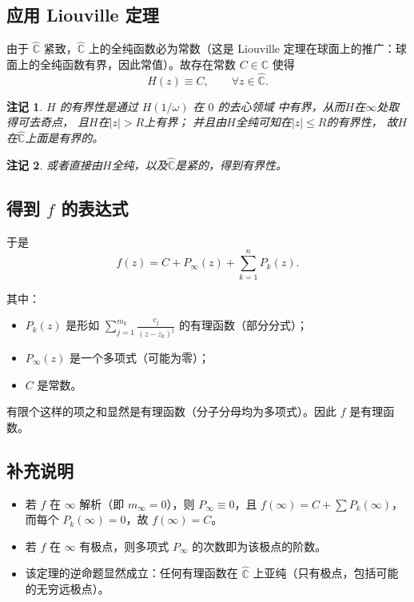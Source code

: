 \documentclass[UTF8]{ctexart}
\newtheorem{remark}{注记}[section]
\numberwithin{equation}{section}
\newcommand{\CC}{\mathbb{C}}
\begin{document}
\subsection{应用 Liouville 定理}

由于 $\widehat{\CC}$ 紧致，$\widehat{\CC}$ 上的全纯函数必为常数（这是 Liouville 定理在球面上的推广：球面上的全纯函数有界，因此常值）。故存在常数 $C \in \CC$ 使得
\[
H(z) \equiv C,\qquad \forall z \in \widehat{\CC}.
\]

\begin{remark}
   $H$ 的有界性是通过 $H(1/\omega)$ 在 $0$ 的去心领域
   中有界，从而$H$在$\infty$处取得可去奇点，
   且$H$在$\left\lvert z\right\rvert > R $上有界；
   并且由$H$全纯可知在$\left\lvert z\right\rvert \le R $的有界性，
   故$H$在$\widehat{\CC}$上面是有界的。

\end{remark}

\begin{remark}
   或者直接由$H$全纯，以及$\widehat{\CC}$是紧的，得到有界性。
\end{remark}

\subsection{得到 $f$ 的表达式}

于是
\[
f(z) = C + P_\infty(z) + \sum_{k=1}^{n} P_k(z).
\]

其中：
\begin{itemize}
\item $P_k(z)$ 是形如 $\displaystyle \sum_{j=1}^{m_k} \frac{c_{j}}{(z-z_k)^j}$ 的有理函数（部分分式）；
\item $P_\infty(z)$ 是一个多项式（可能为零）；
\item $C$ 是常数。
\end{itemize}

有限个这样的项之和显然是有理函数（分子分母均为多项式）。因此 $f$ 是有理函数。

\subsection{补充说明}

\begin{itemize}
\item 若 $f$ 在 $\infty$ 解析（即 $m_\infty = 0$），则 $P_\infty \equiv 0$，且 $f(\infty) = C + \sum P_k(\infty)$，而每个 $P_k(\infty)=0$，故 $f(\infty)=C$。
\item 若 $f$ 在 $\infty$ 有极点，则多项式 $P_\infty$ 的次数即为该极点的阶数。
\item 该定理的逆命题显然成立：任何有理函数在 $\widehat{\CC}$ 上亚纯（只有极点，包括可能的无穷远极点）。
\end{itemize}
\end{document}
